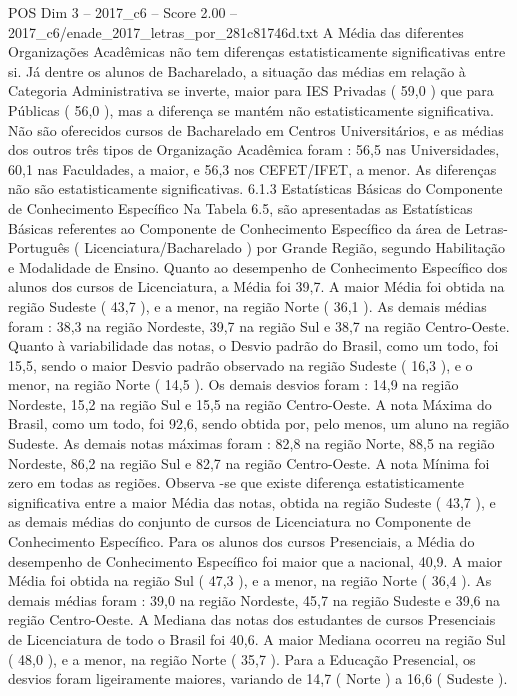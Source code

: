 \begin{textsample}{POS Dim 3 – 2017\_c6 – Score 2.00 – 2017\_c6/enade\_2017\_letras\_por\_281c81746d.txt}
A Média das diferentes Organizações Acadêmicas não tem diferenças estatisticamente significativas entre si.
Já dentre os alunos de Bacharelado, a situação das médias em relação à Categoria Administrativa se inverte, maior para IES Privadas ( 59,0 ) que para Públicas ( 56,0 ), mas a diferença se mantém não estatisticamente significativa.
Não são oferecidos cursos de Bacharelado em Centros Universitários, e as médias dos outros três tipos de Organização Acadêmica foram : 56,5 nas Universidades, 60,1 nas Faculdades, a maior, e 56,3 nos CEFET/IFET, a menor.
As diferenças não são estatisticamente significativas. 6.1.3 Estatísticas Básicas do Componente de Conhecimento Específico Na Tabela 6.5, são apresentadas as Estatísticas Básicas referentes ao Componente de Conhecimento Específico da área de Letras-Português ( Licenciatura/Bacharelado ) por Grande Região, segundo Habilitação e Modalidade de Ensino.
Quanto ao desempenho de Conhecimento Específico dos alunos dos cursos de Licenciatura, a Média foi 39,7.
A maior Média foi obtida na região Sudeste ( 43,7 ), e a menor, na região Norte ( 36,1 ).
As demais médias foram : 38,3 na região Nordeste, 39,7 na região Sul e 38,7 na região Centro-Oeste.
Quanto à variabilidade das notas, o Desvio padrão do Brasil, como um todo, foi 15,5, sendo o maior Desvio padrão observado na região Sudeste ( 16,3 ), e o menor, na região Norte ( 14,5 ).
Os demais desvios foram : 14,9 na região Nordeste, 15,2 na região Sul e 15,5 na região Centro-Oeste.
A nota Máxima do Brasil, como um todo, foi 92,6, sendo obtida por, pelo menos, um aluno na região Sudeste.
As demais notas máximas foram : 82,8 na região Norte, 88,5 na região Nordeste, 86,2 na região Sul e 82,7 na região Centro-Oeste.
A nota Mínima foi zero em todas as regiões.
Observa -se que existe diferença estatisticamente significativa entre a maior Média das notas, obtida na região Sudeste ( 43,7 ), e as demais médias do conjunto de cursos de Licenciatura no Componente de Conhecimento Específico.
Para os alunos dos cursos Presenciais, a Média do desempenho de Conhecimento Específico foi maior que a nacional, 40,9.
A maior Média foi obtida na região Sul ( 47,3 ), e a menor, na região Norte ( 36,4 ).
As demais médias foram : 39,0 na região Nordeste, 45,7 na região Sudeste e 39,6 na região Centro-Oeste.
A Mediana das notas dos estudantes de cursos Presenciais de Licenciatura de todo o Brasil foi 40,6.
A maior Mediana ocorreu na região Sul ( 48,0 ), e a menor, na região Norte ( 35,7 ).
Para a Educação Presencial, os desvios foram ligeiramente maiores, variando de 14,7 ( Norte ) a 16,6 ( Sudeste ).

\end{textsample}
